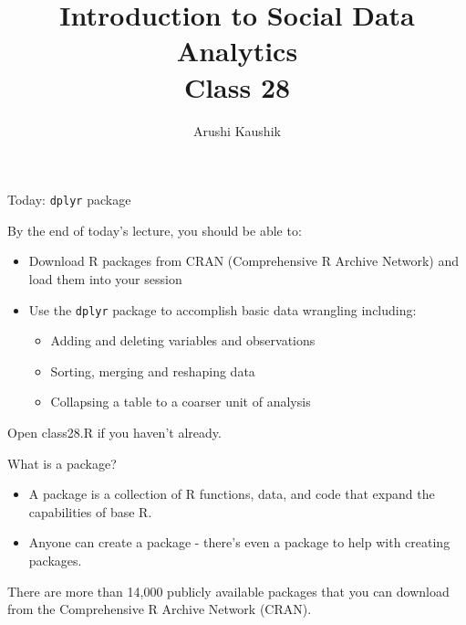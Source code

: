 \documentclass[ignorenonframetext,]{beamer}
\title[Class 28]{Introduction to Social Data Analytics\\
	Class 28}
\author[Kaushik]{Arushi Kaushik}
\institute[UCSD]{arkaushi@ucsd.edu}
\providecommand{\tightlist}{%
	\setlength{\itemsep}{0pt}\setlength{\parskip}{0pt}}
\begin{document}
\frame{\titlepage}

\begin{frame}[fragile]{Today: \texttt{dplyr} package}

By the end of today's lecture, you should be able to:

\begin{itemize}
\tightlist
\item
  Download R packages from CRAN (Comprehensive R Archive Network) and load them into your session
\item
  Use the \texttt{dplyr} package to accomplish basic data wrangling
  including:

  \begin{itemize}
  \tightlist
  \item
    Adding and deleting variables and observations
  \item
    Sorting, merging and reshaping data
  \item
    Collapsing a table to a coarser unit of analysis
  \end{itemize}
\end{itemize}

Open class28.R if you haven't already.

\end{frame}

\begin{frame}{What is a package?}

\begin{itemize}
\tightlist
\item
  A package is a collection of R functions, data, and code that expand
  the capabilities of base R.
\item
  Anyone can create a package - there's even a package to help with
  creating packages.
\end{itemize}

There are more than 14,000 publicly available packages that you can
download from the Comprehensive R Archive Network (CRAN).

\end{frame}
\end{document}
